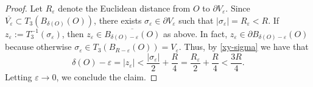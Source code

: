 \documentclass[10pt,a4paper]{amsart}
\begin{document}
\begin{proof}
Let $R_{\varepsilon}$ denote the Euclidean distance from $O$ to $\partial V_{\varepsilon}$. Since $\overline{V_{\varepsilon}}\subset T_{3}(B_{\delta(O)}(O))$, there exists $\sigma_{\varepsilon}\in \partial V_{\varepsilon}$ such that $|\sigma_{\varepsilon}|=R_{\varepsilon} < R$. If $z_{\varepsilon}:=T_{3}^{-1}(\sigma_{\varepsilon})$, then $z_\varepsilon\in \overline{B_{\delta(O)-\varepsilon}(O)}$ as above. In fact, $z_\varepsilon \in \partial B_{\delta(O)-\varepsilon}(O)$ because otherwise $\sigma_\varepsilon \in T_3(B_{R-\varepsilon}(O)) = V_\varepsilon$. Thus, by \eqref{xy-sigma} we have that
$$\delta(O)-\varepsilon = |z_{\varepsilon}|< \frac{|\sigma_{\varepsilon}|}{2}+\frac{R}{4} = \frac{R_\varepsilon}{2}+\frac{R}{4} < \frac{3R}{4}.$$
Letting $\varepsilon\to 0$, we conclude the claim.
\end{proof}
\end{document}
